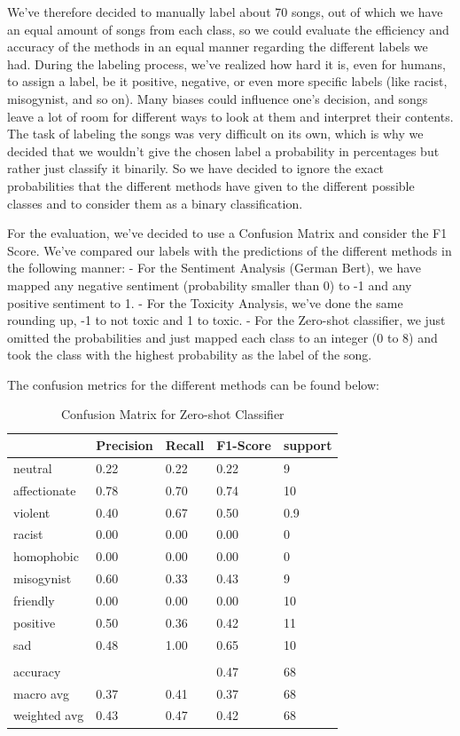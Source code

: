 We've therefore decided to manually label about 70 songs, out of which we have an equal amount of songs from each class, so we could evaluate the efficiency and accuracy of the methods in an equal manner regarding the different labels we had.
During the labeling process, we've realized how hard it is, even for humans, to assign a label, be it positive, negative, or even more specific labels (like racist, misogynist, and so on). Many biases could influence one's decision, and songs leave a lot of room for different ways to look at them and interpret their contents. The task of labeling the songs was very difficult on its own, which is why we decided that we wouldn't give the chosen label a probability in percentages but rather just classify it binarily. So we have decided to ignore the exact probabilities that the different methods have given to the different possible classes and to consider them as a binary classification.

For the evaluation, we've decided to use a Confusion Matrix and consider the F1 Score.
We've compared our labels with the predictions of the different methods in the following manner:
- For the Sentiment Analysis (German Bert), we have mapped any negative sentiment (probability smaller than 0) to -1 and any positive sentiment to 1.
- For the Toxicity Analysis, we've done the same rounding up, -1 to not toxic and 1 to toxic.
- For the Zero-shot classifier, we just omitted the probabilities and just mapped each class to an integer (0 to 8) and took the class with the highest probability as the label of the song.

The confusion metrics for the different methods can be found below:

\begin{table}[h]
\centering
\begin{tabular}{l|llll}
 & Precision & Recall & F1-Score & support \\ \hline
neutral & 0.22 & 0.22 & 0.22 & 9\\
affectionate & 0.78 & 0.70 & 0.74 & 10 \\ 
violent & 0.40 & 0.67 & 0.50 & 0.9\\
racist & 0.00 & 0.00 & 0.00 & 0\\
homophobic & 0.00 & 0.00 & 0.00 & 0\\
misogynist & 0.60 & 0.33 & 0.43 & 9\\
friendly & 0.00 & 0.00 & 0.00 & 10\\
positive & 0.50 & 0.36 & 0.42 & 11\\
sad & 0.48 & 1.00 & 0.65 & 10\\
\\
accuracy & & & 0.47 & 68\\
macro avg & 0.37 & 0.41 & 0.37 & 68 \\
weighted avg & 0.43 & 0.47 & 0.42 & 68\\
\end{tabular}
\caption{Confusion Matrix for Zero-shot Classifier}
\label{tab:confusion_matrix}
\end{table}


